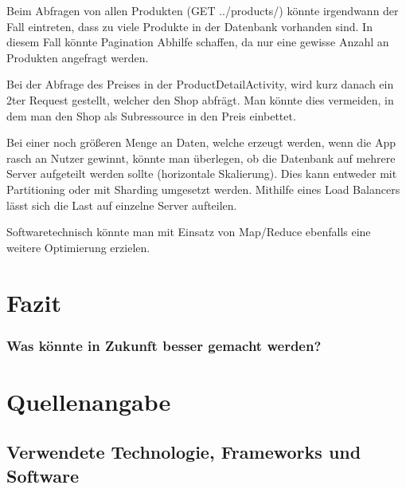 \documentclass{scrartcl}
\begin{document}
\noindent Beim Abfragen von allen Produkten (GET ../products/) könnte irgendwann der Fall eintreten, dass zu viele Produkte in der Datenbank vorhanden sind. In diesem Fall könnte Pagination Abhilfe schaffen, da nur eine gewisse Anzahl an Produkten angefragt werden. \newline  

\noindent Bei der Abfrage des Preises in der ProductDetailActivity, wird kurz danach ein 2ter Request gestellt, welcher den Shop abfrägt. Man könnte dies vermeiden, in dem man den Shop als Subressource in den Preis einbettet. \newline 

\noindent Bei einer noch größeren Menge an Daten, welche erzeugt werden, wenn die App rasch an Nutzer gewinnt, könnte man überlegen, ob die Datenbank auf mehrere Server aufgeteilt werden sollte (horizontale Skalierung). Dies kann entweder mit Partitioning oder mit Sharding umgesetzt werden. Mithilfe eines Load Balancers lässt sich die Last auf einzelne Server aufteilen. \newline 

\noindent Softwaretechnisch könnte man mit Einsatz von Map/Reduce ebenfalls eine weitere Optimierung erzielen.

\newpage




\section{Fazit}



\subsubsection{Was könnte in Zukunft besser gemacht werden?}

\newpage

\section{Quellenangabe}

\subsection{Verwendete Technologie, Frameworks und Software}
\end{document}
